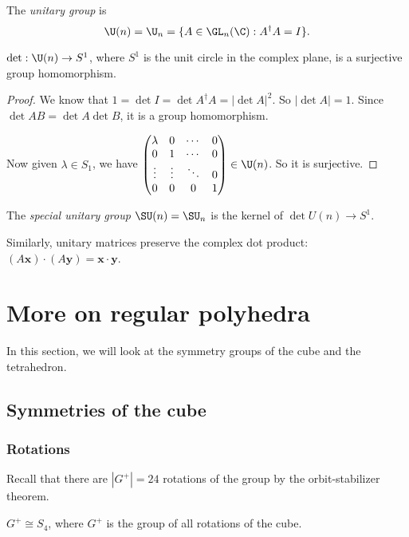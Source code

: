 \documentclass[a4paper]{article}
\begin{document}
\begin{defi}
  The \emph{unitary group} is
  \[
    \U(n) = \U_n = \{A\in \GL_n(\C): A^\dagger A = I\}.
  \]
\end{defi}

\begin{lemma}
  $\det: \U(n)\to S^1$, where $S^1$ is the unit circle in the complex plane, is a surjective group homomorphism.
\end{lemma}

\begin{proof}
  We know that $1 = \det I = \det A^\dagger A = |\det A|^2$. So $|\det A| = 1$. Since $\det AB = \det A\det B$, it is a group homomorphism.

  Now given $\lambda\in S_1$, we have
  $\begin{pmatrix}
    \lambda & 0 & \cdots & 0\\
    0 & 1 & \cdots & 0\\
    \vdots & \vdots & \ddots & 0\\
    0 & 0 & 0 & 1
  \end{pmatrix}\in \U(n)$. So it is surjective.
\end{proof}

\begin{defi}
  The \emph{special unitary group} $\SU(n) = \SU_n$ is the kernel of $\det U(n)\to S^1$.
\end{defi}

Similarly, unitary matrices preserve the complex dot product: $(A\mathbf{x})\cdot (A\mathbf{y}) = \mathbf{x}\cdot \mathbf{y}$.

\section{More on regular polyhedra}
In this section, we will look at the symmetry groups of the cube and the tetrahedron.
\subsection{Symmetries of the cube}
\subsubsection*{Rotations}
Recall that there are $|G^+| = 24$ rotations of the group by the orbit-stabilizer theorem.
\begin{prop}
  $G^+ \cong S_4$, where $G^+$ is the group of all rotations of the cube.
\end{prop}
\end{document}
